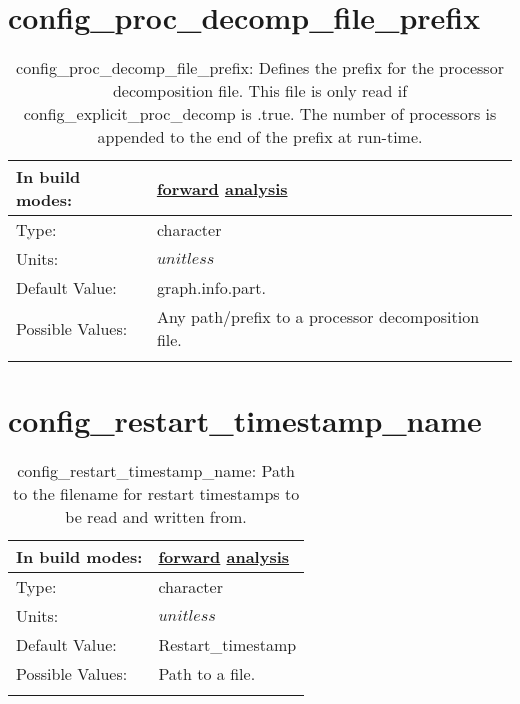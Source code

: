 \section[config\_proc\_decomp\_file\_prefix]{config\_proc\_decomp\_file\_prefix}
\label{sec:nm_sec_config_proc_decomp_file_prefix}
\begin{center}
\begin{longtable}{| p{2.0in} || p{4.0in} |}
    \hline
    In build modes: & \hyperref[subsec:forward_nm_tab_decomposition]{forward} \hyperref[subsec:analysis_nm_tab_decomposition]{analysis} \\
    \hline
    Type: & character \\
    \hline
    Units: & $unitless$ \\
    \hline
    Default Value: & graph.info.part. \\
    \hline
    Possible Values: & Any path/prefix to a processor decomposition file. \\
    \hline
    \caption{config\_proc\_decomp\_file\_prefix: Defines the prefix for the processor decomposition file. This file is only read if config\_explicit\_proc\_decomp is .true. The number of processors is appended to the end of the prefix at run-time.}
\end{longtable}
\end{center}
\section[config\_restart\_timestamp\_name]{config\_restart\_timestamp\_name}
\label{sec:nm_sec_config_restart_timestamp_name}
\begin{center}
\begin{longtable}{| p{2.0in} || p{4.0in} |}
    \hline
    In build modes: & \hyperref[subsec:forward_nm_tab_time_management]{forward} \hyperref[subsec:analysis_nm_tab_time_management]{analysis} \\
    \hline
    Type: & character \\
    \hline
    Units: & $unitless$ \\
    \hline
    Default Value: & Restart\_timestamp \\
    \hline
    Possible Values: & Path to a file. \\
    \hline
    \caption{config\_restart\_timestamp\_name: Path to the filename for restart timestamps to be read and written from.}
\end{longtable}
\end{center}
